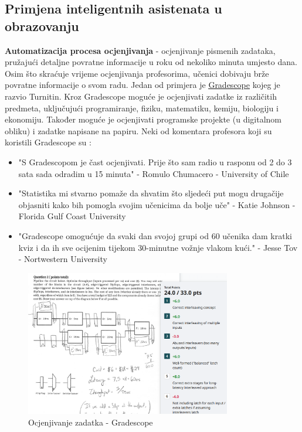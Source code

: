 \documentclass[]{foi}
\begin{document}
\subsection{Primjena inteligentnih asistenata u obrazovanju}

    \textbf{Automatizacija procesa ocjenjivanja} - ocjenjivanje pismenih zadataka, pružajući detaljne povratne informacije u roku od nekoliko minuta umjesto dana. 
    Osim što skraćuje vrijeme ocjenjivanja profesorima, učenici dobivaju brže povratne informacije o svom radu. Jedan od primjera je \href{https://www.gradescope.com/}{\underline{Gradescope}} kojeg je razvio Turnitin. 
    Kroz Gradescope moguće je ocjenjivati zadatke iz različitih predmeta, uključujući programiranje, fiziku, matematiku, kemiju, biologiju i ekonomiju. Također moguće je ocjenjivati
    programske projekte (u digitalnom obliku) i zadatke napisane na papiru. Neki od komentara profesora koji su koristili Gradescope su \cite{gradescope2025}:  
    \begin{itemize}
        \item "S Gradescopom je čast ocjenjivati. Prije što sam radio u rasponu od 2 do 3 sata sada odradim u 15 minuta" - Romulo Chumacero - University of Chile
        \item "Statistika mi stvarno pomaže da shvatim što sljedeći put mogu drugačije objasniti kako bih pomogla svojim učenicima da bolje uče" - Katie Johnson - Florida Gulf Coast University
        \item "Gradescope omogućuje da svaki dan svojoj grupi od 60 učenika dam kratki kviz i da ih sve ocijenim tijekom 30-minutne vožnje vlakom kući." -  Jesse Tov - Nortwestern University
    \end{itemize}

    \begin{figure}[ht!]
    \centering
    \includegraphics[width=0.8\textwidth]{./assets/Gradescope.png} 
    \caption{Ocjenjivanje zadatka - Gradescope}
    \label{fig:slika7}
    \end{figure}
\end{document}
